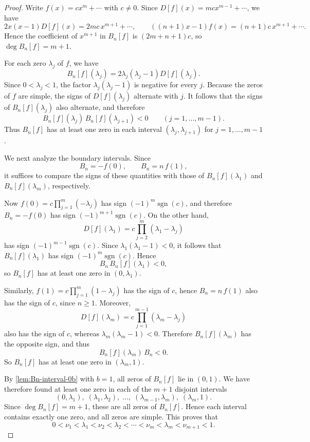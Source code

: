 \documentclass[11pt,twoside]{article}
\numberwithin{equation}{section}
\begin{document}
\begin{proof}
Write \(f(x)=cx^m+\cdots\) with \(c\neq 0\). Since \(D[f](x)=mcx^{m-1}+\cdots\), we have
\[
2x(x-1)D[f](x)=2mc\,x^{m+1}+\cdots,
\qquad
((n+1)x-1)f(x)=(n+1)c\,x^{m+1}+\cdots.
\]
Hence the coefficient of \(x^{m+1}\) in \(B_n[f]\) is \((2m+n+1)c\), so \(\deg B_n[f]=m+1\).

For each zero \(\lambda_j\) of \(f\), we have
\[
B_n[f](\lambda_j)=2\lambda_j(\lambda_j-1)D[f](\lambda_j).
\]
Since \(0<\lambda_j<1\), the factor \(\lambda_j(\lambda_j-1)\) is negative for every \(j\). Because the zeros of \(f\) are simple, the signs of \(D[f](\lambda_j)\) alternate with \(j\). It follows that the signs of \(B_n[f](\lambda_j)\) also alternate, and therefore
\[
B_n[f](\lambda_j)\,B_n[f](\lambda_{j+1})<0
\qquad (j=1,\dots,m-1).
\]
Thus \(B_n[f]\) has at least one zero in each interval \((\lambda_j,\lambda_{j+1})\) for \(j=1,\dots,m-1\).

We next analyze the boundary intervals. Since
\[
B_n=-f(0),
\qquad
B_n=n\,f(1),
\]
it suffices to compare the signs of these quantities with those of \(B_n[f](\lambda_1)\) and \(B_n[f](\lambda_m)\), respectively.

Now \(f(0)=c\prod_{j=1}^m(-\lambda_j)\) has sign \((-1)^m\operatorname{sgn}(c)\), and therefore \(B_n=-f(0)\) has sign \((-1)^{m+1}\operatorname{sgn}(c)\). On the other hand,
\[
D[f](\lambda_1)=c\prod_{j=2}^m(\lambda_1-\lambda_j)
\]
has sign \((-1)^{m-1}\operatorname{sgn}(c)\). Since \(\lambda_1(\lambda_1-1)<0\), it follows that \(B_n[f](\lambda_1)\) has sign \((-1)^m\operatorname{sgn}(c)\). Hence
\[
B_n\,B_n[f](\lambda_1)<0,
\]
so \(B_n[f]\) has at least one zero in \((0,\lambda_1)\).

Similarly, \(f(1)=c\prod_{j=1}^m(1-\lambda_j)\) has the sign of \(c\), hence \(B_n=n\,f(1)\) also has the sign of \(c\), since \(n\ge1\). Moreover,
\[
D[f](\lambda_m)=c\prod_{j=1}^{m-1}(\lambda_m-\lambda_j)
\]
also has the sign of \(c\), whereas \(\lambda_m(\lambda_m-1)<0\). Therefore \(B_n[f](\lambda_m)\) has the opposite sign, and thus
\[
B_n[f](\lambda_m)\,B_n<0.
\]
So \(B_n[f]\) has at least one zero in \((\lambda_m,1)\).

By \cref{lem:Bn-interval-0b} with \(b=1\), all zeros of \(B_n[f]\) lie in \((0,1)\). We have therefore found at least one zero in each of the \(m+1\) disjoint intervals
\[
(0,\lambda_1),\;(\lambda_1,\lambda_2),\;\dots,\;(\lambda_{m-1},\lambda_m),\;(\lambda_m,1).
\]
Since \(\deg B_n[f]=m+1\), these are all zeros of \(B_n[f]\). Hence each interval contains exactly one zero, and all zeros are simple. This proves that
\[
0<\nu_1<\lambda_1<\nu_2<\lambda_2<\cdots<\nu_m<\lambda_m<\nu_{m+1}<1.
\]
\end{proof}
\end{document}
